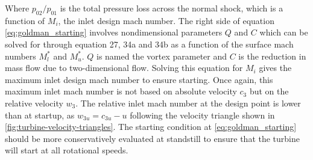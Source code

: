 Where $p_{02}/p_{01}$ is the total pressure loss across the normal shock, which is a function of $M_i$, the inlet design mach number. The right side of equation \eqref{eq:goldman_starting} involves nondimensional parameters $Q$ and $C$ which can be solved for through equation 27, 34a and 34b as a function of the surface mach numbers $M^*_l$ and $M^*_u$. $Q$ is named the vortex parameter \cite{sudhofDevelopmentTechniquesSupersonic2020} and $C$ is the reduction in mass flow due to two-dimensional flow. Solving this equation for $M_i$ gives the maximum inlet design mach number to ensure starting. Once again, this maximum inlet mach number is not based on absolute velocity $c_3$ but on the relative velocity $w_3$. The relative inlet mach number at the design point is lower than at startup, as $w_{3u}=c_{3u}-u$ following the velocity triangle shown in \cref{fig:turbine-velocity-triangles}. The starting condition at \cref{eq:goldman_starting} should be more conservatively evaluated at standstill to ensure that the turbine will start at all rotational speeds.








